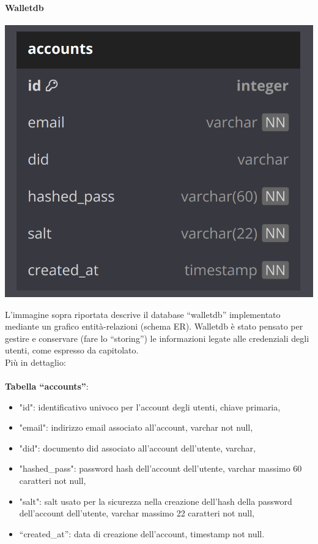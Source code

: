 \paragraph{Walletdb}
\begin{center}
    \includegraphics[scale = 0.3]{./res/img/walletdb.png}
  \end{center}

L’immagine sopra riportata descrive il database “walletdb” implementato mediante un grafico entità-relazioni (schema ER).
Walletdb è stato pensato per gestire e conservare (fare lo “storing”) le informazioni legate alle credenziali degli utenti, come espresso da capitolato.\\
Più in dettaglio:\\\\
\textbf{Tabella “accounts”}:
\begin{itemize}
    \item "id": identificativo univoco per l'account degli utenti, chiave primaria,
    \item "email": indirizzo email associato all'account, varchar not null,
    \item "did": documento did associato all'account dell'utente, varchar,
    \item "hashed\_pass": password hash dell'account dell'utente, varchar massimo 60 caratteri not null,
    \item "salt": salt usato per la sicurezza nella creazione dell'hash della password dell'account dell'utente, varchar massimo 22 caratteri not null,
    \item “created\_at”: data di creazione dell’account, timestamp not null.
\end{itemize}

